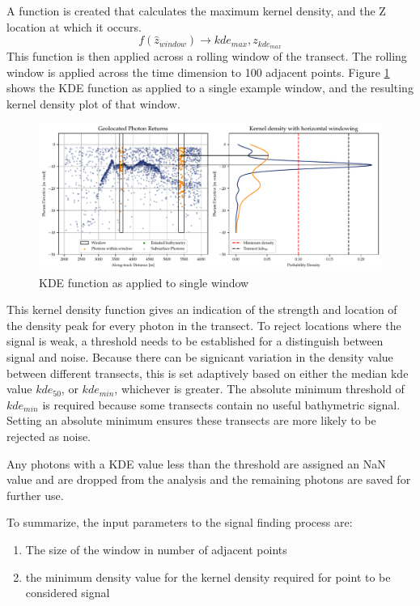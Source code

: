 A function is created that calculates the maximum kernel density, and the Z location at which it occurs. $$ f(\hat{z}_{window}) \rightarrow kde_{max},z_{kde_{max}} $$ This function is then applied across a rolling window of the transect. The rolling window is applied across the time dimension to 100 adjacent points. Figure \ref{fig:kdefunc} shows the KDE function as applied to a single example window, and the resulting kernel density plot of that window.

\begin{figure}[htbp]
    \centering
    \includegraphics[width=\textwidth]{figures/2d_kde_plot.pdf}
    \caption{KDE function as applied to single window}
    \label{fig:kdefunc}
\end{figure}

This kernel density function gives an indication of the strength and location of the density peak for every photon in the transect. To reject locations where the signal is weak, a threshold needs to be established for a distinguish between signal and noise. Because there can be signicant variation in the density value between different transects, this is set adaptively based on either the median kde value $kde_{50}$, or $kde_{min}$, whichever is greater. The absolute minimum threshold of $kde_{min}$ is required because some transects contain no useful bathymetric signal. Setting an absolute minimum ensures these transects are more likely to be rejected as noise. 

Any photons with a KDE value less than the threshold are assigned an NaN value and are dropped from the analysis and the remaining photons are saved for further use.

To summarize, the input parameters to the signal finding process are:

\begin{enumerate}
    \item The size of the window in number of adjacent points
    \item the minimum density value for the kernel density required for point to be considered signal
\end{enumerate}

